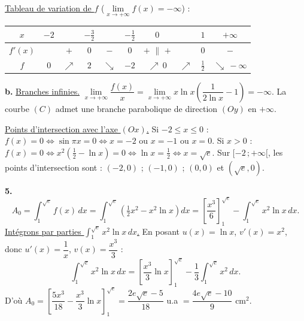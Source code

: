 \documentclass[11pt]{article}
\begin{document}
\underline{Tableau de variation de $f$} ($\lim\limits_{x\to+\infty} f(x) = -\infty$) :
\begin{center}
\renewcommand{\arraystretch}{1.4}
\begin{tabular}{|c|ccccccccc|}
\hline
$x$ & $-2$ & & $-\frac{3}{2}$ & & $-\frac{1}{2}$ & $0$ & & $1$ & $+\infty$ \\
\hline
$f'(x)$ & & $+$ & $0$ & $-$ & $0$ & $+$ \;$\|$\; $+$ & & $0$ & $-$ \\
\hline
$f$ & $0$ & $\nearrow$ & $2$ & $\searrow$ & $-2$ & $\nearrow\ 0$ & $\nearrow$ & $\frac{1}{2}$ & $\searrow\ -\infty$ \\
\hline
\end{tabular}
\end{center}

\textbf{b.} \underline{Branches infinies.} $\lim\limits_{x\to+\infty}\dfrac{f(x)}{x} = \lim\limits_{x\to+\infty} x\ln x\left(\dfrac{1}{2\ln x} - 1\right) = -\infty$. La courbe $(C)$ admet une branche parabolique de direction $(Oy)$ en $+\infty$.

\underline{Points d'intersection avec l'axe $(Ox)$.} Si $-2 \le x \le 0$ : $f(x) = 0 \Leftrightarrow \sin\pi x = 0 \Leftrightarrow x = -2$ ou $x = -1$ ou $x = 0$. Si $x > 0$ : $f(x) = 0 \Leftrightarrow x^2\left(\tfrac{1}{2} - \ln x\right) = 0 \Leftrightarrow \ln x = \tfrac{1}{2} \Leftrightarrow x = \sqrt{e}$. Sur $[-2\,;+\infty[$, les points d'intersection sont : $(-2, 0)$ ; $(-1, 0)$ ; $(0, 0)$ et $(\sqrt{e}, 0)$.

\begin{center}
\end{center}

\textbf{5.}
\[ A_0 = \int_1^{\sqrt{e}} f(x)\,dx = \int_1^{\sqrt{e}}\left(\tfrac{1}{2}x^2 - x^2\ln x\right)dx = \left[\frac{x^3}{6}\right]_1^{\sqrt{e}} - \int_1^{\sqrt{e}} x^2\ln x\,dx. \]
\underline{Intégrons par parties $\displaystyle\int_1^{\sqrt{e}} x^2\ln x\,dx$.} En posant $u(x) = \ln x$, $v'(x) = x^2$, donc $u'(x) = \dfrac{1}{x}$, $v(x) = \dfrac{x^3}{3}$ :
\[ \int_1^{\sqrt{e}} x^2\ln x\,dx = \left[\frac{x^3}{3}\ln x\right]_1^{\sqrt{e}} - \frac{1}{3}\int_1^{\sqrt{e}} x^2\,dx. \]
D'où $A_0 = \left[\dfrac{5x^3}{18} - \dfrac{x^3}{3}\ln x\right]_1^{\sqrt{e}} = \dfrac{2e\sqrt{e} - 5}{18}$ u.a $= \dfrac{4e\sqrt{e} - 10}{9}$ cm$^2$.
\end{document}
